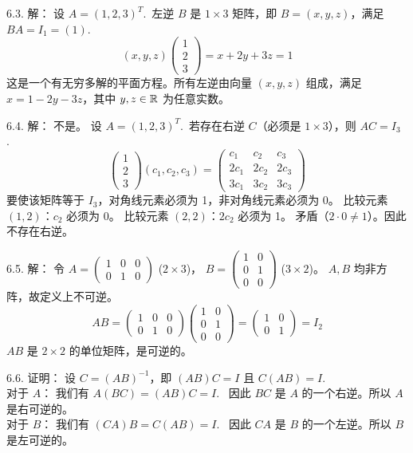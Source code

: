 \begin{exer}
6.3. 解：
设 $A = (1, 2, 3)^T$.~左逆 $B$ 是 $1 \times 3$ 矩阵，即 $B = (x, y, z)$，满足 $BA = I_1 = (1)$.~
$$ (x, y, z) \begin{pmatrix} 1 \\ 2 \\ 3 \end{pmatrix} = x + 2y + 3z = 1 $$
这是一个有无穷多解的平面方程。所有左逆由向量 $(x, y, z)$ 组成，满足 $x = 1 - 2y - 3z$，其中 $y, z \in \mathbb{R}$ 为任意实数。

6.4. 解：
不是。
设 $A = (1, 2, 3)^T$.~若存在右逆 $C$（必须是 $1 \times 3$），则 $AC = I_3$.~
$$ \begin{pmatrix} 1 \\ 2 \\ 3 \end{pmatrix} (c_1, c_2, c_3) = \begin{pmatrix} c_1 & c_2 & c_3 \\ 2c_1 & 2c_2 & 2c_3 \\ 3c_1 & 3c_2 & 3c_3 \end{pmatrix} $$
要使该矩阵等于 $I_3$，对角线元素必须为 1，非对角线元素必须为 0。
比较元素 $(1, 2)$：$c_2$ 必须为 0。
比较元素 $(2, 2)$：$2c_2$ 必须为 1。
矛盾（$2 \cdot 0 \neq 1$）。因此不存在右逆。

6.5. 解：
令 $A = \begin{pmatrix} 1 & 0 & 0 \\ 0 & 1 & 0 \end{pmatrix}$ ($2 \times 3$)， $B = \begin{pmatrix} 1 & 0 \\ 0 & 1 \\ 0 & 0 \end{pmatrix}$ ($3 \times 2$)。
$A, B$ 均非方阵，故定义上不可逆。
$$ AB = \begin{pmatrix} 1 & 0 & 0 \\ 0 & 1 & 0 \end{pmatrix} \begin{pmatrix} 1 & 0 \\ 0 & 1 \\ 0 & 0 \end{pmatrix} = \begin{pmatrix} 1 & 0 \\ 0 & 1 \end{pmatrix} = I_2 $$
$AB$ 是 $2 \times 2$ 的单位矩阵，是可逆的。

6.6. 证明：
设 $C = (AB)^{-1}$，即 $(AB)C = I$ 且 $C(AB) = I$.~
\\
对于 $A$：
我们有 $A (B C) = (AB) C = I$.~
因此 $BC$ 是 $A$ 的一个右逆。所以 $A$ 是右可逆的。
\\
对于 $B$：
我们有 $(C A) B = C (AB) = I$.~
因此 $CA$ 是 $B$ 的一个左逆。所以 $B$ 是左可逆的。


\end{exer}
